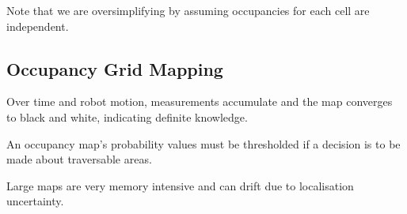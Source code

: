 \documentclass[11pt]{article}
\begin{document}
Note that we are oversimplifying by assuming occupancies for each cell are independent.

\subsection{Occupancy Grid Mapping}
Over time and robot motion, measurements accumulate and the map converges to black and white, indicating definite knowledge.

An occupancy map's probability values must be thresholded if a decision is to be made about traversable areas.

Large maps are very memory intensive and can drift due to localisation uncertainty.
\end{document}
